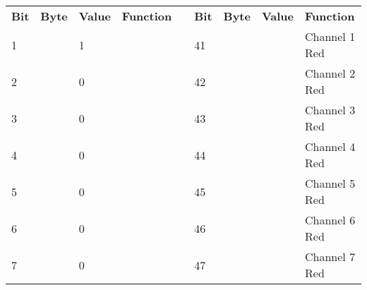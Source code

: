 \documentclass[]{article}
\begin{document}
\begin{landscape}
	\begin{table}[]
		\footnotesize
		\begin{tabular}{lllllllll}
			\cline{1-4} \cline{6-9}
			\textbf{Bit}             & \textbf{Byte}            & \textbf{Value}           & \textbf{Function}              &                    & \textbf{Bit}                                          & \textbf{Byte}        & \textbf{Value}     & \textbf{Function}                                 \\ \cline{1-4} \cline{6-9} 
			1                        &                          & 1                        &                                &                    & 41                                                    &                      &                    & Channel 1 Red                                     \\
			2                        &                          & 0                        &                                &                    & 42                                                    &                      &                    & Channel 2 Red                                     \\
			3                        &                          & 0                        &                                &                    & 43                                                    &                      &                    & Channel 3 Red                                     \\
			4                        &                          & 0                        &                                &                    & 44                                                    &                      &                    & Channel 4 Red                                     \\
			5                        &                          & 0                        &                                &                    & 45                                                    &                      &                    & Channel 5 Red                                     \\
			6                        &                          & 0                        &                                &                    & 46                                                    &                      &                    & Channel 6 Red                                     \\
			7                        &                          & 0                        &                                &                    & 47                                                    &                      &                    & Channel 7 Red                                     \\

\end{tabular}
\end{table}
\end{landscape}
\end{document}

